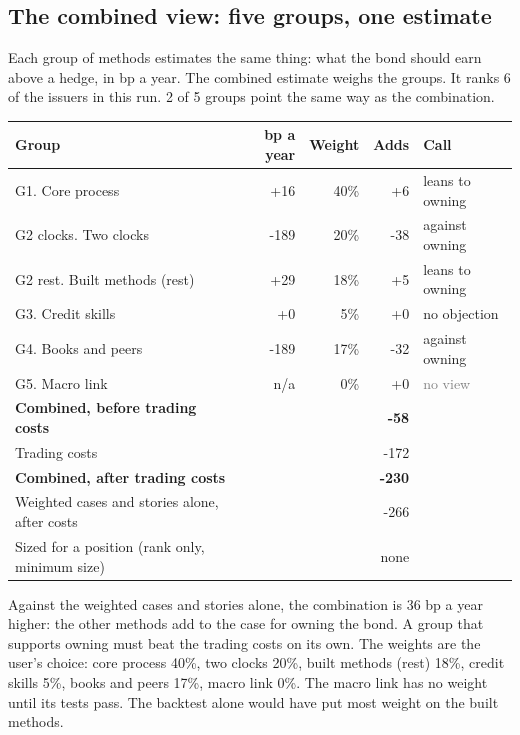 \documentclass[11pt,a4paper]{article}
\begin{document}
\subsection*{The combined view: five groups, one estimate}
Each group of methods estimates the same thing: what the bond should earn above a hedge, in bp a year. The combined estimate weighs the groups. It ranks 6 of the issuers in this run. 2 of 5 groups point the same way as the combination.
\begin{center}\footnotesize\setlength{\tabcolsep}{3.5pt}\begin{tabular}{@{}lrrrl@{}}\toprule
Group & bp a year & Weight & Adds & Call \\\midrule
G1. Core process & +16 & 40\% & +6 & \textcolor{amber}{leans to owning} \\
G2 clocks. Two clocks & -189 & 20\% & -38 & \textcolor{bad}{against owning} \\
G2 rest. Built methods (rest) & +29 & 18\% & +5 & \textcolor{amber}{leans to owning} \\
G3. Credit skills & +0 & 5\% & +0 & \textcolor{good}{no objection} \\
G4. Books and peers & -189 & 17\% & -32 & \textcolor{bad}{against owning} \\
G5. Macro link & n/a & 0\% & +0 & \textcolor{gray}{no view} \\
\textbf{Combined, before trading costs} &  &  & \textbf{-58} &  \\
Trading costs &  &  & -172 &  \\
\textbf{Combined, after trading costs} &  &  & \textbf{-230} &  \\
Weighted cases and stories alone, after costs &  &  & -266 &  \\
Sized for a position (rank only, minimum size) &  &  & none &  \\
\bottomrule\end{tabular}\end{center}
Against the weighted cases and stories alone, the combination is 36 bp a year higher: the other methods add to the case for owning the bond. A group that supports owning must beat the trading costs on its own. The weights are the user's choice: core process 40\%, two clocks 20\%, built methods (rest) 18\%, credit skills 5\%, books and peers 17\%, macro link 0\%. The macro link has no weight until its tests pass. The backtest alone would have put most weight on the built methods.
\par\noindent{}
\end{document}
